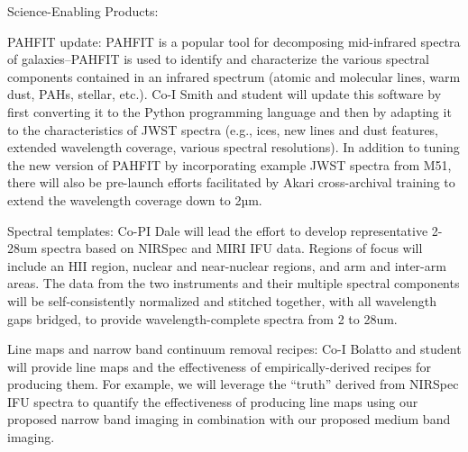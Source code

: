 \documentclass[12pt]{article}
\begin{document}

\analysisplan %

Science-Enabling Products:

PAHFIT update: PAHFIT is a popular tool for decomposing mid-infrared spectra of galaxies--PAHFIT is used to identify and characterize the various spectral components contained in an infrared spectrum (atomic and molecular lines, warm dust, PAHs, stellar, etc.).   Co-I Smith and student will update this software by first converting it to the Python programming language and then by adapting it to the characteristics of JWST spectra (e.g., ices, new lines and dust features, extended wavelength coverage, various spectral resolutions).  In addition to tuning the new version of PAHFIT by incorporating example JWST spectra from M51, there will also be pre-launch efforts facilitated by Akari cross-archival training to extend the wavelength coverage down to 2µm. 

Spectral templates: Co-PI Dale will lead the effort to develop representative 2-28um spectra based on NIRSpec and MIRI IFU data.  Regions of focus will include an HII region, nuclear and near-nuclear regions, and arm and inter-arm areas.  The data from the two instruments and their multiple spectral components will be self-consistently normalized and stitched together, with all wavelength gaps bridged, to provide wavelength-complete spectra from 2 to 28um.  

Line maps and narrow band continuum removal recipes: Co-I Bolatto and student will provide line maps and the effectiveness of empirically-derived recipes for producing them.  For example, we will leverage the ``truth'' derived from NIRSpec IFU spectra to quantify the effectiveness of producing line maps using our proposed narrow band imaging in combination with our proposed medium band imaging.  
\end{document}
